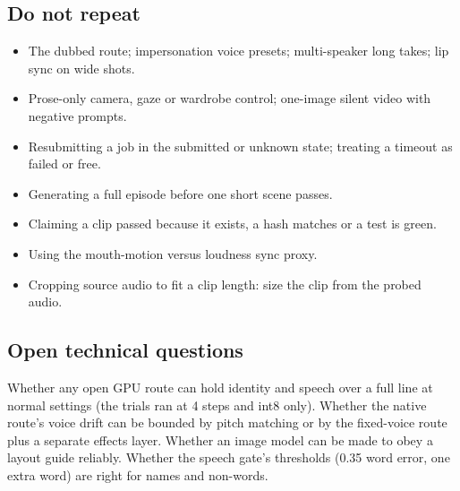 \documentclass[11pt,a4paper]{article}
\begin{document}
\subsection{Do not repeat}
\begin{itemize}
\item The dubbed route; impersonation voice presets; multi-speaker long takes; lip sync on wide shots.
\item Prose-only camera, gaze or wardrobe control; one-image silent video with negative prompts.
\item Resubmitting a job in the submitted or unknown state; treating a timeout as failed or free.
\item Generating a full episode before one short scene passes.
\item Claiming a clip passed because it exists, a hash matches or a test is green.
\item Using the mouth-motion versus loudness sync proxy.
\item Cropping source audio to fit a clip length: size the clip from the probed audio.
\end{itemize}

\subsection{Open technical questions}
Whether any open GPU route can hold identity and speech over a full line at normal settings (the trials ran at 4 steps and int8 only). Whether the native route's voice drift can be bounded by pitch matching or by the fixed-voice route plus a separate effects layer. Whether an image model can be made to obey a layout guide reliably. Whether the speech gate's thresholds (0.35 word error, one extra word) are right for names and non-words.
\end{document}
